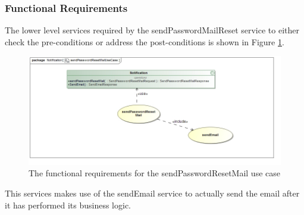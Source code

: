 \subsubsection{Functional Requirements}
The lower level services required by the sendPasswordMailReset service to either check the
pre-conditions or address the post-conditions is shown in Figure
\ref{sendPasswordMailFunctionalRequirements}.
\begin{figure}[H]
	\begin{center}
		\includegraphics[scale=0.7]{../Diagrams and Charts/Notifications/sendPasswordResetMailUseCase.jpg}
		\caption{The functional requirements for the sendPasswordResetMail use case}
	\end{center}
	\label{sendPasswordMailFunctionalRequirements}
\end{figure}

This services makes use of the sendEmail service to actually send the email after
it has performed its business logic.

